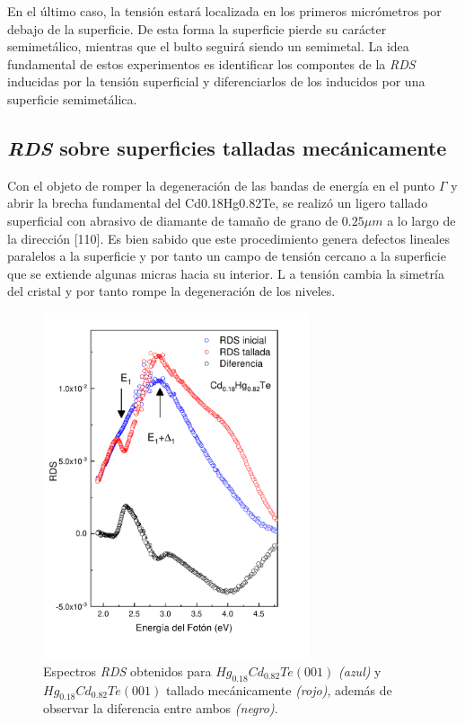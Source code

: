 En el último caso, la tensión estará localizada en los primeros micrómetros por debajo de la superficie. De esta forma 
la superficie pierde su carácter semimetálico, mientras que el bulto seguirá siendo un semimetal. La idea fundamental de 
estos experimentos es identificar los compontes de la \textit{RDS} inducidas por la tensión superficial y diferenciarlos 
de los inducidos por una superficie semimetálica.


\subsection{\textit{RDS} sobre superficies talladas mecánicamente}
\label{sec:chap4-hgcdte-rds}
Con el objeto de romper la degeneración de las bandas de energía en el punto $\Gamma$ y abrir la brecha fundamental del 
Cd0.18Hg0.82Te, se realizó un ligero tallado superficial con abrasivo de diamante de tamaño de grano de $ 0.25 \mu m $ 
a lo largo de la dirección [110]. Es bien sabido que este procedimiento genera defectos lineales paralelos a la 
superficie y por tanto un campo de tensión cercano a la superficie que se extiende algunas micras hacia su interior\cite{LastrasMartnez1996}. L
a tensión cambia la simetría del cristal y por tanto rompe la degeneración de los niveles. 

\begin{figure}[h!]
    \centering
    \includegraphics[width=0.7\textwidth]{figures/chap4/hgcdte_rds_comparision.pdf}
        \caption{Espectros \textit{RDS} obtenidos para $ Hg_{0.18}Cd_{0.82}Te (001)$ \textit{(azul)} y 
        $ Hg_{0.18}Cd_{0.82}Te (001)$ tallado mecánicamente \textit{(rojo)}, además de observar la diferencia entre 
        ambos \textit{(negro)}.}
    \label{fig:hgcdte_rds_comparision}
\end{figure}

